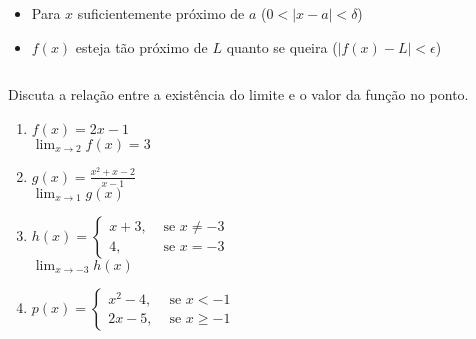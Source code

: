 \begin{frame}
\begin{columns}[onlytextwidth]
\begin{column}{0.49\textwidth}
\begin{itemize}
        \item Para $x$ suficientemente próximo de $a$ ($0<|x-a|<\delta$)\vspace{-0.1cm}
        \item $f(x)$ esteja tão próximo de $L$ quanto se queira ($|f(x)-L|<\epsilon$)\vspace{-0.1cm}
      \end{itemize}
      \begin{figure}
      \end{figure}
    \end{column}
  \end{columns}
\end{frame}

\begin{frame}
  \begin{columns}[onlytextwidth]
    \begin{column}{0.49\textwidth}\vspace{-0.5cm}
      \begin{example}
        Discuta a relação entre a existência do limite e o valor da função no ponto.
      \end{example}
      \begin{enumerate}
        \item<only@1-2> $f(x) = 2x-1$ \\ \vspace{0.2cm}
        $\displaystyle\lim_{x\to 2}{f(x)}=3$
        \item<only@3-4> $\displaystyle g(x) = \frac{x^{2}+x-2}{x-1}$ \\ \vspace{0.2cm}
        $\displaystyle\lim_{x\to 1}{g(x)}$
        \item<only@5-6> $h(x) = \begin{cases}x+3, &\mbox{ se } x\not=-3 \\ 4, &\mbox{ se } x = -3\end{cases}$ \\ \vspace{0.2cm}
        $\displaystyle\lim_{x\to -3}{h(x)}$
        \item<only@7-8>
        $\displaystyle p(x) = \begin{cases}x^{2} - 4, &\mbox{ se } x < -1 \\ 2x-5, &\mbox{ se } x \geq -1\end{cases}$ \\ \vspace{0.2cm}

\end{enumerate}
\end{column}
\end{columns}
\end{frame}
